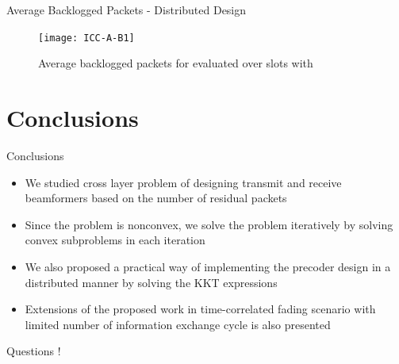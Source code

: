 \documentclass[9pt]{beamer}
\begin{document}
\begin{frame}{Average Backlogged Packets - Distributed Design}
	\begin{figure}
		\centering
		\texttt{[image: ICC-A-B1]}
		\caption{Average backlogged packets for  evaluated over  slots with }
		\label{fig-2}
	\end{figure}
\end{frame}




%


\section{Conclusions}

\begin{frame}{Conclusions}
\begin{itemize}
\item We studied cross layer problem of designing transmit and receive beamformers based on the number of residual packets
\item Since the problem is nonconvex, we solve the problem iteratively by solving convex subproblems in each iteration
\item We also proposed a practical way of implementing the precoder design in a distributed manner by solving the \ac{KKT} expressions
\item Extensions of the proposed work in time-correlated fading scenario with limited number of information exchange cycle is also presented
\end{itemize}
\end{frame}


\begin{frame}
\begin{center}
{\color{blue}\Huge{Questions !}}
\end{center}
\end{frame}
\end{document}
